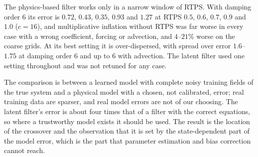  The physics-based filter works only in a narrow window
of RTPS. With damping order 6 its error is $0.72$, $0.43$, $0.35$, $0.93$ and $1.27$ at
RTPS $0.5$, $0.6$, $0.7$, $0.9$ and $1.0$ ($c=16$), and multiplicative inflation
without RTPS was far worse in every case with a wrong coefficient, forcing
or advection, and $4$--$21\%$ worse on the coarse grids. At its best setting
it is over-dispersed, with spread over error $1.6$--$1.75$ at damping order 6
and up to $6$ with advection. The
latent filter used one setting throughout and was not retuned for any
case. 

 The comparison is between a
learned model with complete noisy training fields of the true system and
a physical model with a chosen, not calibrated, error; real training data
are sparser, and real model errors are not of our choosing. The latent
filter's error is about four times that of a filter with the correct
equations, so where a trustworthy model exists it should be used. The
result is the location of the crossover and the observation that it is
set by the state-dependent part of the model error, which is the part
that parameter estimation and bias correction cannot reach.

\begin{table}[htbp]
\caption{Learned versus physics-based filters under model error, 2D KS at
$44^2$, steady-state analysis error in field units, mean over seeds 0--2
(range). One-cycle error: the physics model's root-mean-square one-cycle
forecast error from the true state on an independent trajectory, total
and state-dependent (after subtracting its mean). Tuned: best RTPS and
localization. Best: best configuration including online parameter
estimation (est.) or bias correction (bc), selected on seed 0. The latent
filter is the same in every row, $0.312$ ($0.302$--$0.324$), except for the hidden-field cases, where the
latent model was trained on that system and the comparison is in its field units. Outcome: a filter
wins if its three-seed mean is at least $10\%$ lower and it is lower on every seed; the factor is the
ratio of the means.}
\label{tab:da_model_error}
\end{table}


